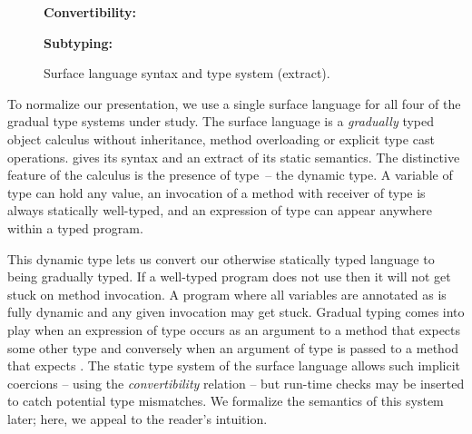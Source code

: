 \documentclass[USenglish]{tex/lipics-v2016}
\begin{document}
\begin{figure}[!t]
{\bf Convertibility:}\\[-6mm]
  
\begin{mathpar}
    
    
\end{mathpar}


{\bf Subtyping:}\\[-6mm]

\begin{mathpar}



\end{mathpar}

\hrulefill
\caption{Surface language syntax and type system (extract).}\label{slts}
\end{figure}

To normalize our presentation, we use a single surface language for all
four of the gradual type systems under study. The surface language is  a
\emph{gradually} typed object calculus without inheritance, method overloading
or explicit type cast operations.  gives its syntax and an
extract of its static semantics. The distinctive feature of the calculus  is
the presence of type \any\,-- the dynamic type. A variable of type \any can
hold any value, an invocation of a method with receiver of type \any is
always statically well-typed, and an expression of type \any can appear
anywhere within a typed program.

This dynamic type lets us convert our otherwise statically typed language to
being gradually typed. If a well-typed program does not use \any then it
will not get stuck on method invocation.  A program where all variables are
annotated as \any is fully dynamic and any given invocation may get
stuck. Gradual typing comes into play when an expression of type \any occurs
as an argument to a method that expects some other type \C and conversely
when an argument of type \C is passed to a method that expects \any. The
static type system of the surface language allows such implicit coercions --
using the \emph{convertibility} relation -- but run-time checks may be
inserted to catch potential type mismatches. We formalize the
semantics of this system later; here, we appeal to the reader's intuition.
\end{document}
